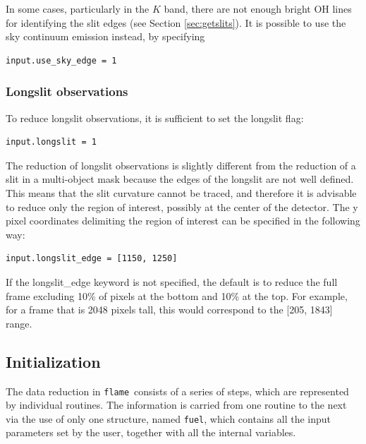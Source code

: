 \documentclass[a4paper, notitlepage]{article}
\newcommand{\flame}{\texttt{flame}}
\newcommand{\fuel}{\texttt{fuel}}
\begin{document}
In some cases, particularly in the $K$ band, there are not enough bright OH lines for identifying the slit edges (see Section \ref{sec:getslits}). It is possible to use the sky continuum emission instead, by specifying
\begin{lstlisting}
input.use_sky_edge = 1
\end{lstlisting}


\subsubsection{Longslit observations}

To reduce longslit observations, it is sufficient to set the longslit flag:
\begin{lstlisting}
input.longslit = 1
\end{lstlisting}

The reduction of longslit observations is slightly different from the reduction of a slit in a multi-object mask because the edges of the longslit are not well defined. This means that the slit curvature cannot be traced, and therefore it is advisable to reduce only the region of interest, possibly at the center of the detector. The y pixel coordinates delimiting the region of interest can be specified in the following way:
\begin{lstlisting}
input.longslit_edge = [1150, 1250]
\end{lstlisting}
If the longslit\_edge keyword is not specified, the default is to reduce the full frame excluding 10\% of pixels at the bottom and 10\% at the top. For example, for a frame that is 2048 pixels tall, this would correspond to the [205, 1843] range.





\subsection{Initialization}

The data reduction in \flame\ consists of a series of steps, which are represented by individual routines. The information is carried from one routine to the next via the use of only one structure, named \fuel, which contains all the input parameters set by the user, together with all the internal variables.
\end{document}
